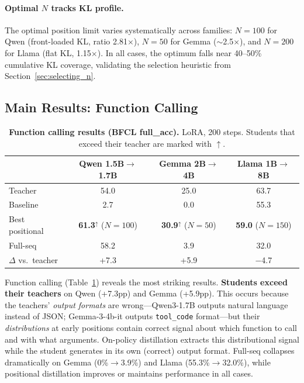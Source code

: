 \documentclass[10pt]{article}
\begin{document}
\paragraph{Optimal $N$ tracks KL profile.} The optimal position limit varies systematically across families: $N{=}100$ for Qwen (front-loaded KL, ratio 2.81$\times$), $N{=}50$ for Gemma (${\sim}$2.5$\times$), and $N{=}200$ for Llama (flat KL, 1.15$\times$). In all cases, the optimum falls near 40--50\% cumulative KL coverage, validating the selection heuristic from Section~\ref{sec:selecting_n}.

\subsection{Main Results: Function Calling}
\label{sec:funcall}

\begin{table}[t]
\centering
\caption{\textbf{Function calling results (BFCL full\_acc).} LoRA, 200 steps. Students that exceed their teacher are marked with $\uparrow$.}
\label{tab:funcall_main}
\small
\begin{tabular}{l ccc}
\toprule
& \textbf{Qwen 1.5B$\to$1.7B} & \textbf{Gemma 2B$\to$4B} & \textbf{Llama 1B$\to$8B} \\
\midrule
Teacher & 54.0 & 25.0 & 63.7 \\
Baseline & 2.7 & 0.0 & 55.3 \\
\midrule
Best positional & \textbf{61.3}$^{\uparrow}$ ($N{=}100$) & \textbf{30.9}$^{\uparrow}$ ($N{=}50$) & \textbf{59.0} ($N{=}150$) \\
Full-seq & 58.2 & 3.9 & 32.0 \\
\midrule
$\Delta$ vs.\ teacher & +7.3 & +5.9 & $-$4.7 \\
\bottomrule
\end{tabular}
\end{table}

Function calling (Table~\ref{tab:funcall_main}) reveals the most striking results. \textbf{Students exceed their teachers} on Qwen (+7.3pp) and Gemma (+5.9pp). This occurs because the teachers' \emph{output formats} are wrong---Qwen3-1.7B outputs natural language instead of JSON; Gemma-3-4b-it outputs \texttt{tool\_code} format---but their \emph{distributions} at early positions contain correct signal about which function to call and with what arguments. On-policy distillation extracts this distributional signal while the student generates in its own (correct) output format. Full-seq collapses dramatically on Gemma (0\%$\to$3.9\%) and Llama (55.3\%$\to$32.0\%), while positional distillation improves or maintains performance in all cases.
\end{document}
